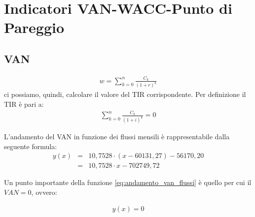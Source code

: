\chapter[Indicatori VAN-WACC-Punto di Pareggio]{Indicatori VAN-WACC-Punto di Pareggio}
\section[VAN]{VAN}
	\begin{equation}
	\label{eq:van}
	\begin{split}
 		w = \sum_{k=0}^n \frac{C_k}{(1+r)^k}
	\end{split}
	\end{equation}
	ci possiamo, quindi, calcolare il valore del \ac{TIR} corrispondente. Per definizione il \ac{TIR} è pari a:
	\begin{equation}
	\label{eq:tir}
	\begin{split}
 		\sum_{k=0}^n \frac{C_k}{(1+i)^k} = 0
	\end{split}
	\end{equation}	 

	L'andamento del \ac{VAN} in funzione dei flussi mensili è rappresentabile dalla seguente formula:	
	\begin{eqnarray}
	\label{eq:andamento_van_flussi}
 		y(x) & = & 10,7528 \cdot ( x - 60131,27 ) - 56170,20		\nonumber \\
 			 & = & 10,7528 \cdot x - 702749,72
	\end{eqnarray}


Un punto importante della funzione \ref{eq:andamento_van_flussi} è quello per cui il $ VAN = 0 $, ovvero:

	\begin{equation}
	\label{eq:van_zero}
	\begin{split}
 		y(x) = 0
 	\end{split}
	\end{equation}

